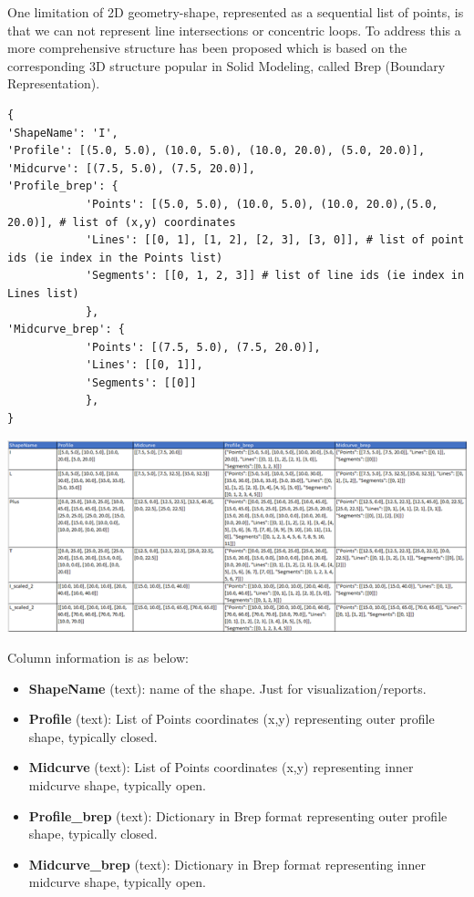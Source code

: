 \documentclass[conference]{IEEEtran}
\begin{document}
One limitation of 2D geometry-shape, represented as a sequential list of points, is that we can not represent line intersections or concentric loops. To address this a more comprehensive structure has been proposed which is based on the corresponding 3D structure popular in Solid Modeling, called Brep (Boundary Representation).

\begin{lstlisting}[basicstyle=\tiny, breaklines=true, breakatwhitespace=true, label=lst:python]
{
'ShapeName': 'I',
'Profile': [(5.0, 5.0), (10.0, 5.0), (10.0, 20.0), (5.0, 20.0)],
'Midcurve': [(7.5, 5.0), (7.5, 20.0)],
'Profile_brep': {
			'Points': [(5.0, 5.0), (10.0, 5.0), (10.0, 20.0),(5.0, 20.0)], # list of (x,y) coordinates
			'Lines': [[0, 1], [1, 2], [2, 3], [3, 0]], # list of point ids (ie index in the Points list)
			'Segments': [[0, 1, 2, 3]] # list of line ids (ie index in Lines list)
			},
'Midcurve_brep': {
			'Points': [(7.5, 5.0), (7.5, 20.0)],
			'Lines': [[0, 1]],
			'Segments': [[0]]
			},				
}
\end{lstlisting}

         \begin{center}
	\includegraphics[width=0.8\linewidth]{images/shapes_csv}
	\label{fig_csv}
    \end{center}

Column information is as below:
	\begin{itemize}
	\item {\bf ShapeName} (text): name of the shape. Just for visualization/reports.
	\item {\bf Profile} (text): List of Points coordinates (x,y) representing outer profile shape, typically closed.
	\item {\bf Midcurve} (text): List of Points coordinates (x,y) representing inner midcurve shape, typically open.
	\item {\bf Profile\_brep} (text): Dictionary in Brep format representing outer profile shape, typically closed.
	\item {\bf Midcurve\_brep} (text): Dictionary in Brep format representing inner midcurve shape, typically open.
	\end{itemize}
\end{document}
